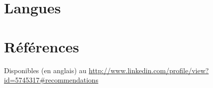 \documentclass[10pt,letter,sans]{moderncv}   %
\begin{document}
\section{Langues}

\section{R\'{e}f\'{e}rences}
Disponibles (en anglais) au \url{http://www.linkedin.com/profile/view?id=5745317#recommendations}


%
\end{document}
